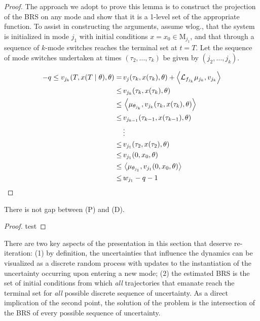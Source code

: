     \begin{proof}
    The approach we adopt to prove this lemma is to construct the projection of the BRS on any mode and show that it is a 1-level set of the appropriate function. To assist in constructing the arguments, assume wlog., that the system is initialized in mode $j_1$ with initial conditions $x=x_0\in \mathrm M_{j_1}$, and that through a sequence of $k$-mode switches reaches the terminal set at $t=T$. Let the sequence of mode switches undertaken at times $(\tau_2,\ldots,\tau_{k})$ be given by $(j_2,\ldots,j_{k})$.
    
    \small
        \begin{align}
          -q\le v_{j_k}(T,x(T\mid\theta),\theta)=&\,v_j(\tau_k,x(\tau_k),\theta)+\left\langle \mathcal L_{f_{j_k}}\mu_{j_k},v_{j_k}\right\rangle\\
          \le&\, v_{j_k}(\tau_k,x(\tau_k),\theta)\\
          \le&\, \left\langle \mu_{\theta_{j_k}},v_{j_k}(\tau_k,x(\tau_k),\theta)\right\rangle\\
          \le&\, v_{j_{k-1}}(\tau_{k-1},x(\tau_{k-1}),\theta)\\\nonumber
          &\,\vdots\\
          \le &\,v_{j_1}(\tau_2,x(\tau_2),\theta)\\
          \le &\,v_{j_1}(0,x_0,\theta)\\
          \le &\,\left\langle \mu_{\theta_{j_1}},v_{j_1}(0,x_0,\theta)\right\rangle\\
          \le &\, w_{j_1}-q-1
        \end{align}
    \normalfont
    \end{proof}
    \begin{lemma}
      There is not gap between (P) and (D).
    \end{lemma}
    \begin{proof}
      test
    \end{proof}
    \begin{remark}
    There are two key aspects of the presentation in this section that deserve re-iteration: (1) by definition, the uncertainties that influence the dynamics can be visualized as a discrete random process with updates to the instantiation of the uncertainty occurring upon entering a new mode; (2) the estimated BRS is the set of initial conditions from which {\em all} trajectories that emanate reach the terminal set for {\em all} possible discrete sequence of uncertainty. As a direct implication of the second point, the solution of the problem is the intersection of the BRS of every possible sequence of uncertainty.
    \end{remark}
